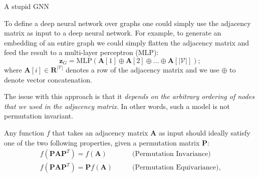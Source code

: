\documentclass[10pt, aspectratio=169, compress, protectframetitle, handout]{beamer}
\begin{document}
\begin{frame}{A stupid GNN}

    To define a \alert{deep neural network over graphs} one could simply use the adjacency matrix as input to a deep neural network. For example, to generate an embedding of an entire graph we could simply flatten the adjacency matrix and feed the result to a multi-layer perceptron (MLP):
    \begin{equation}
        \mathbf z_G = \text{MLP}(\mathbf A[1] \oplus \mathbf A[2] \oplus \ldots \oplus \mathbf A[|\mathcal V|]);
    \end{equation}
    where $\mathbf A[i] \in \mathbf R^{|\mathcal V|}$ denotes a row of the adjacency matrix and we use $\oplus$ to denote vector concatenation.
    
    The issue with this approach is that it \textit{depends on the arbitrary ordering of nodes that we used in the adjacency matrix}. In other words, such a model is \alert{not permutation invariant}.
    
    Any function $f$ that takes an adjacency matrix $\mathbf A$ as input should ideally satisfy one of the two following properties, given a permutation matrix $\mathbf P$:
    \begin{align}
        f(\mathbf{PAP}^T) = f(\mathbf A) \qquad &\text{(Permutation Invariance)} \\
        f(\mathbf{PAP}^T) = \mathbf P f(\mathbf A) \qquad &\text{(Permutation Equivariance)},
    \end{align}
    
\end{frame}
\end{document}
